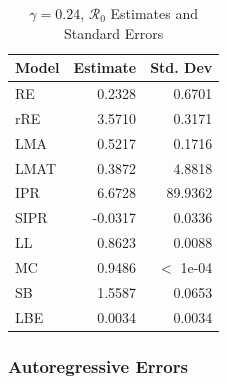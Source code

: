 \documentclass[12pt]{article}
\newcommand{\rr}{\ensuremath{\mathcal{R}_0}}
\begin{document}
\begin{table}[H]
	
	\centering
	\begin{tabular}[t]{l|r|r}
		\hline
		Model & Estimate & Std. Dev\\
		\hline
		RE & 0.2328 & 0.6701\\
		\hline
		rRE & 3.5710 & 0.3171\\
		\hline
		LMA & 0.5217 & 0.1716\\
		\hline
		LMAT & 0.3872 & 4.8818\\
		\hline
		IPR & 6.6728 & 89.9362\\
		\hline
		SIPR & -0.0317 & 0.0336\\
		\hline
		LL & 0.8623 & 0.0088\\
		\hline
		MC & 0.9486 & $<$ 1e-04\\
		\hline
		SB & 1.5587 & 0.0653\\
		\hline
		LBE & 0.0034 & 0.0034\\
		\hline
	\end{tabular}
	\caption{$\gamma = 0.24$, $\rr$ Estimates and Standard Errors}
\end{table}

\subsubsection{Autoregressive Errors}
\end{document}
